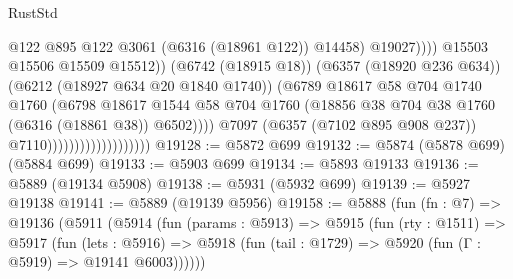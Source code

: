 \begin{lexlean}{RustStd}
\begin{coremodule}
                                                          @122
                                                          @895
                                                          @122
                                                          @3061
                                                          (@6316 (@18961 @122))
                                                          @14458)
                                                        @19027))))
                                                @15503
                                                @15506
                                                @15509
                                                @15512))
                                            (@6742 (@18915 @18))
                                            (@6357 (@18920 @236 @634))
                                            (@6212 (@18927 @634 @20 @1840 @1740))
                                            (@6789
                                              @18617
                                              @58
                                              @704
                                              @1740
                                              @1760
                                              (@6798
                                                @18617
                                                @1544
                                                @58
                                                @704
                                                @1760
                                                (@18856
                                                  @38
                                                  @704
                                                  @38
                                                  @1760
                                                  (@6316 (@18861 @38))
                                                  @6502))))
                                          @7097
                                          (@6357 (@7102 @895 @908 @237))
                                          @7110)))))))))))))))))))
@19128 := @5872 @699
@19132 := @5874 (@5878 @699) (@5884 @699)
@19133 := @5903 @699
@19134 := @5893 @19133
@19136 := @5889 (@19134 @5908)
@19138 := @5931 (@5932 @699)
@19139 := @5927 @19138
@19141 := @5889 (@19139 @5956)
@19158 := @5888
    (fun (fn : @7) =>
    @19136
      (@5911
        (@5914
          (fun (params : @5913) =>
          @5915
            (fun (rty : @1511) =>
            @5917
              (fun (lets : @5916) =>
              @5918 (fun (tail : @1729) => @5920 (fun (Γ : @5919) => @19141 @6003))))))

\end{coremodule}
\end{lexlean}

